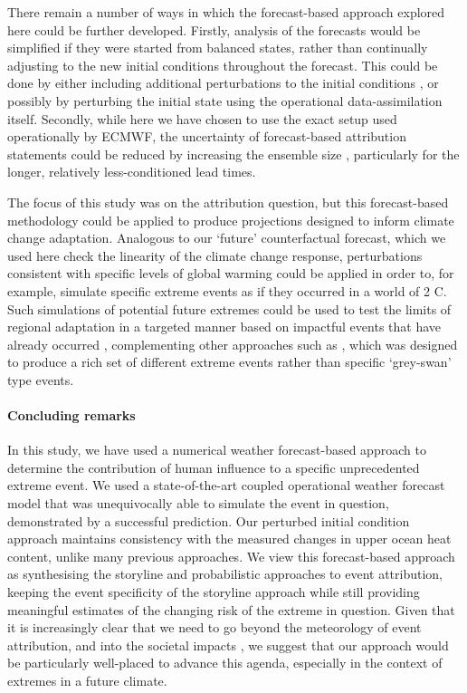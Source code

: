   There remain a number of ways in which the forecast-based approach explored here could be further developed. Firstly, analysis of the forecasts would be simplified if they were started from balanced states, rather than continually adjusting to the new initial conditions throughout the forecast. This could be done by either including additional perturbations to the initial conditions \cite[ie. to the land-surface and atmospheric states,][]{wang_initialized_2021,reed_attribution_2022,wehner_operational_2022}, or possibly by perturbing the initial state using the operational data-assimilation itself. Secondly, while here we have chosen to use the exact setup used operationally by ECMWF, the uncertainty of forecast-based attribution statements could be reduced by increasing the ensemble size \cite[we note that 51 members is a relatively small ensemble in the context of traditional attribution-specific experiments,][]{massey_weatherhome-development_2015,ciavarella_upgrade_2018}, particularly for the longer, relatively less-conditioned lead times.

  The focus of this study was on the attribution question, but this forecast-based methodology could be applied to produce projections designed to inform climate change adaptation. Analogous to our `future' counterfactual forecast, which we used here check the linearity of the climate change response, perturbations consistent with specific levels of global warming could be applied in order to, for example, simulate specific extreme events as if they occurred in a world of 2 \textdegree{}C. Such simulations of potential future extremes could be used to test the limits of regional adaptation in a targeted manner based on impactful events that have already occurred \cite{hazeleger_tales_2015}, complementing other approaches such as \cite{leach_generating_2022}, which was designed to produce a rich set of different extreme events rather than specific `grey-swan' type events.

  \paragraph*{Concluding remarks}

    In this study, we have used a numerical weather forecast-based approach to determine the contribution of human influence to a specific unprecedented extreme event. We used a state-of-the-art coupled operational weather forecast model that was unequivocally able to simulate the event in question, demonstrated by a successful prediction. Our perturbed initial condition approach maintains consistency with the measured changes in upper ocean heat content, unlike many previous approaches. We view this forecast-based approach as synthesising the storyline and probabilistic approaches to event attribution, keeping the event specificity of the storyline approach while still providing meaningful estimates of the changing risk of the extreme in question. Given that it is increasingly clear that we need to go beyond the meteorology of event attribution, and into the societal impacts \cite{mitchell_climate_2021,mitchell_increased_2022}, we suggest that our approach would be particularly well-placed to advance this agenda, especially in the context of extremes in a future climate.


